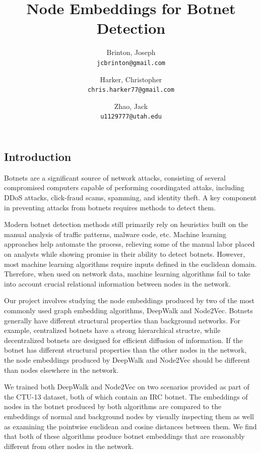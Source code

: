 \documentclass[10pt]{article}
\title{Node Embeddings for Botnet Detection}
\author{
	Brinton, Joseph\\
	\texttt{jcbrinton@gmail.com}
	\and
	Harker, Christopher\\
	\texttt{chris.harker77@gmail.com}
	\and
	Zhao, Jack\\
	\texttt{u1129777@utah.edu}
}
\begin{document}
\maketitle

\begin{multicols}{2}

\section{Introduction}

Botnets are a significant source of network attacks, consisting of several compromised computers capable of performing coordingated attaks, including DDoS attacks, click-fraud scams, spamming, and identity theft. A key component in preventing attacks from botnets requires methods to detect them.

Modern botnet detection methods still primarily rely on heuristics built on the manual analysis of traffic patterns, malware code, etc. Machine learning approaches help automate the process, relieving some of the manual labor placed on analysts while showing promise in their ability to detect botnets. However, most machine learning algorithms require inputs defined in the euclidean domain. Therefore, when used on network data, machine learning algorithms fail to take into account crucial relational information between nodes in the network. 

Our project involves studying the node embeddings produced by two of the most commonly used graph embedding algorithms, DeepWalk and Node2Vec. Botnets generally have different structural properties than background networks. For example, centralized botnets have a strong hierarchical structre, while decentralized botnets are designed for efficient diffusion of information. If the botnet has different structural properties than the other nodes in the network, the node embeddings produced by DeepWalk and Node2Vec should be different than nodes elsewhere in the network. 

We trained both DeepWalk \cite{Perozzi} and Node2Vec \cite{Grover} on two scenarios provided as part of the CTU-13 \cite{Garcia} dataset, both of which contain an IRC botnet. The embeddings of nodes in the botnet produced by both algorithms are compared to the embeddings of normal and background nodes by visually inspecting them as well as examining the pointwise euclidean and cosine distances between them. We find that both of these algorithms produce botnet embeddings that are reasonably different from other nodes in the network. 


\end{multicols}
\end{document}
